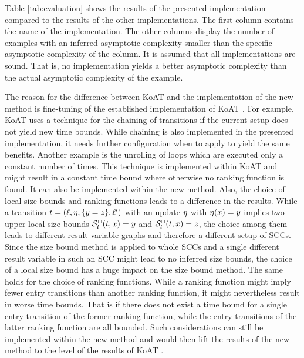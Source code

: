 Table \ref{tab:evaluation} shows the results of the presented implementation compared to the results of the other implementations.
The first column contains the name of the implementation.
The other columns display the number of examples with an inferred asymptotic complexity smaller than the specific asymptotic complexity of the column.
It is assumed that all implementations are sound.
That is, no implementation yields a better asymptotic complexity than the actual asymptotic complexity of the example.

The reason for the difference between KoAT \cite{koat} and the implementation of the new method is fine-tuning of the established implementation of KoAT \cite{koat}.
For example, KoAT \cite{koat} uses a technique for the chaining of transitions if the current setup does not yield new time bounds.
While chaining is also implemented in the presented implementation, it needs further configuration when to apply to yield the same benefits.
Another example is the unrolling of loops which are executed only a constant number of times.
This technique is implemented within KoAT \cite{koat} and might result in a constant time bound where otherwise no ranking function is found.
It can also be implemented within the new method.
Also, the choice of local size bounds and ranking functions leads to a difference in the results.
While a transition $t = (\ell, \eta, \lbrace y=z \rbrace, \ell')$ with an update $\eta$ with $\eta(x)=y$ implies two upper local size bounds ${\mathcal{S}^\sqcap_l}(t,x)=y$ and ${\mathcal{S}^\sqcap_l}(t,x)=z$, the choice among them leads to different result variable graphs and therefore a different setup of SCCs.
Since the size bound method is applied to whole SCCs and a single different result variable in such an SCC might lead to no inferred size bounds, the choice of a local size bound has a huge impact on the size bound method.
The same holds for the choice of ranking functions.
While a ranking function might imply fewer entry transitions than another ranking function, it might nevertheless result in worse time bounds.
That is if there does not exist a time bound for a single entry transition of the former ranking function, while the entry transitions of the latter ranking function are all bounded.
Such considerations can still be implemented within the new method and would then lift the results of the new method to the level of the results of KoAT \cite{koat}.
